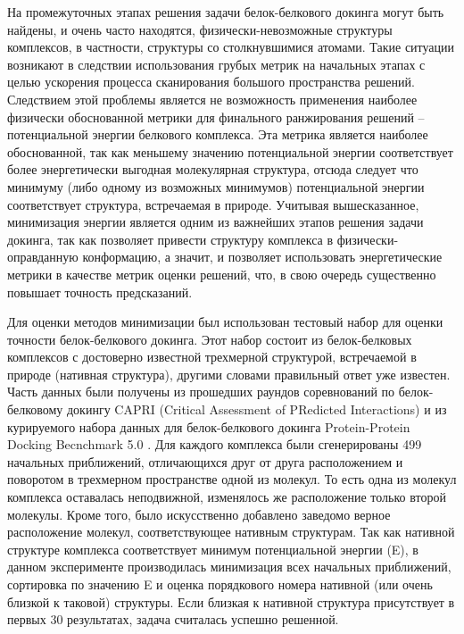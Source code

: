   На промежуточных этапах решения задачи белок-белкового докинга могут быть найдены, и очень часто находятся, физически-невозможные структуры комплексов, в частности, структуры со столкнувшимися атомами. Такие ситуации возникают в следствии использования грубых метрик на начальных этапах с целью ускорения процесса сканирования большого пространства решений. Следствием этой проблемы является не возможность применения наиболее физически обоснованной метрики для финального ранжирования решений -- потенциальной энергии белкового комплекса. Эта метрика является наиболее обоснованной, так как меньшему значению потенциальной энергии соответствует более энергетически выгодная молекулярная структура, отсюда следует что минимуму (либо одному из возможных минимумов) потенциальной энергии соответствует структура, встречаемая в природе. Учитывая вышесказанное, минимизация энергии является одним из важнейших этапов решения задачи докинга, так как позволяет привести структуру комплекса в физически-оправданную конформацию, а значит, и позволяет использовать энергетические метрики в качестве метрик оценки решений, что, в свою очередь существенно повышает точность предсказаний. 

  Для оценки методов минимизации был использован тестовый набор для оценки точности белок-белкового докинга. Этот набор состоит из белок-белковых комплексов с достоверно известной трехмерной структурой, встречаемой в природе (нативная структура), другими словами правильный ответ уже известен. Часть данных были получены из прошедших раундов соревнований по белок-белковому докингу CAPRI (Critical Assessment of PRedicted Interactions) \cite{janin2002welcome} и из курируемого набора данных для белок-белкового докинга Protein-Protein Docking Becnchmark 5.0 \cite{vreven2015updates}. Для каждого комплекса были сгенерированы 499 начальных приближений, отличающихся друг от друга расположением и поворотом в трехмерном пространстве одной из молекул. То есть одна из молекул комплекса оставалась неподвижной, изменялось же расположение только второй молекулы. Кроме того, было искусственно добавлено заведомо верное расположение молекул, соответствующее нативным структурам. Так как нативной структуре комплекса соответствует минимум потенциальной энергии (E), в данном эксперименте производилась минимизация всех начальных приближений, сортировка по значению E и оценка порядкового номера нативной (или очень близкой к таковой) структуры. Если близкая к нативной структура присутствует в первых 30 результатах, задача считалась успешно решенной.

